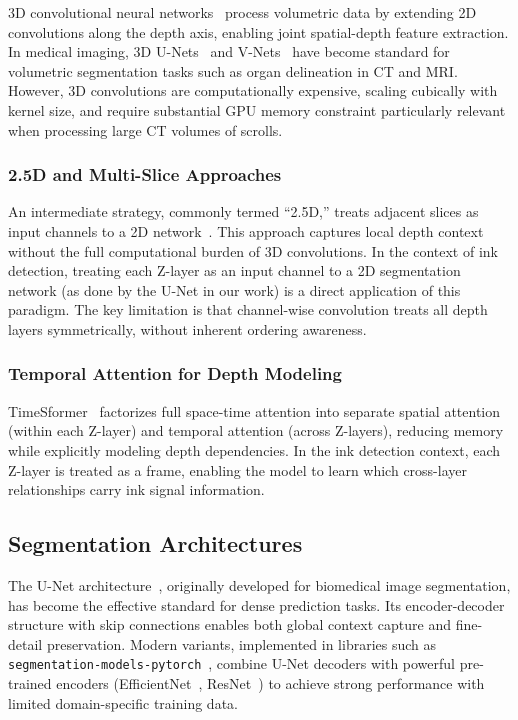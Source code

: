 3D convolutional neural networks~\cite{ji20133d, tran2015c3d} process volumetric data by extending 2D convolutions along the depth axis, enabling joint spatial-depth feature extraction. In medical imaging, 3D U-Nets~\cite{cicek20163d} and V-Nets~\cite{milletari2016vnet} have become standard for volumetric segmentation tasks such as organ delineation in CT and MRI. However, 3D convolutions are computationally expensive, scaling cubically with kernel size, and require substantial GPU memory constraint particularly relevant when processing large CT volumes of scrolls.

\subsubsection{2.5D and Multi-Slice Approaches}

An intermediate strategy, commonly termed ``2.5D,'' treats adjacent slices as input channels to a 2D network~\cite{roth2014new, xia2018bridging}. This approach captures local depth context without the full computational burden of 3D convolutions. In the context of ink detection, treating each Z-layer as an input channel to a 2D segmentation network (as done by the U-Net in our work) is a direct application of this paradigm. The key limitation is that channel-wise convolution treats all depth layers symmetrically, without inherent ordering awareness.

\subsubsection{Temporal Attention for Depth Modeling}

TimeSformer~\cite{bertasius2021timesformer} factorizes full space-time attention into separate spatial attention (within each Z-layer) and temporal attention (across Z-layers), reducing memory while explicitly modeling depth dependencies. In the ink detection context, each Z-layer is treated as a frame, enabling the model to learn which cross-layer relationships carry ink signal information.

\subsection{Segmentation Architectures}

The U-Net architecture~\cite{ronneberger2015unet}, originally developed for biomedical image segmentation, has become the effective standard for dense prediction tasks. Its encoder-decoder structure with skip connections enables both global context capture and fine-detail preservation. Modern variants, implemented in libraries such as \texttt{segmentation-models-pytorch}~\cite{iakubovskii2019smp}, combine U-Net decoders with powerful pre-trained encoders (EfficientNet~\cite{tan2019efficientnet}, ResNet~\cite{he2016resnet}) to achieve strong performance with limited domain-specific training data.

